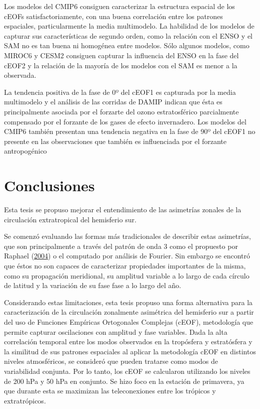 \documentclass[12pt,oneside,a4paper]{reedthesis}
\begin{document}
Los modelos del CMIP6 consiguen caracterizar la estructura espacial de los cEOFs satisfactoriamente, con una buena correlación entre los patrones espaciales, particularmente la media multimodelo.
La habilidad de los modelos de capturar sus características de segundo orden, como la relación con el ENSO y el SAM no es tan buena ni homogénea entre modelos.
Sólo algunos modelos, como MIROC6 y CESM2 consiguen capturar la influencia del ENSO en la fase del cEOF2 y la relación de la mayoría de los modelos con el SAM es menor a la observada.

La tendencia positiva de la fase de 0º del cEOF1 es capturada por la media multimodelo y el análisis de las corridas de DAMIP indican que ésta es principalmente asociada por el forzarte del ozono estratosférico parcialmente compensado por el forzante de los gases de efecto invernadero.
Los modelos del CMIP6 también presentan una tendencia negativa en la fase de 90º del cEOF1 no presente en las observaciones que también es influenciada por el forzante antropogénico

\hypertarget{conclusiones}{%
\chapter{Conclusiones}\label{conclusiones}}

Esta tesis se propuso mejorar el entendimiento de las asimetrías zonales de la circulación extratropical del hemisferio sur.

Se comenzó evaluando las formas más tradicionales de describir estas asimetrías, que son principalmente a través del patrón de onda 3 como el propuesto por Raphael (\protect\hyperlink{ref-raphael2004}{2004}) o el computado por análisis de Fourier.
Sin embargo se encontró que éstos no son capaces de caracterizar propiedades importantes de la misma, como su propagación meridional, su amplitud variable a lo largo de cada círculo de latitud y la variación de su fase fase a lo largo del año.

Considerando estas limitaciones, esta tesis propuso una forma alternativa para la caracterización de la circulación zonalmente asimétrica del hemisferio sur a partir del uso de Funciones Empíricas Ortogonales Complejas (cEOF), metodología que permite capturar oscilaciones con amplitud y fase variables.
Dada la alta correlación temporal entre los modos observados en la tropósfera y estratósfera y la similitud de sus patrones espaciales al aplicar la metodología cEOF en distintos niveles atmosféricos, se consideró que pueden tratarse como modos de variabilidad conjunta.
Por lo tanto, los cEOF se calcularon utilizando los niveles de 200 hPa y 50 hPa en conjunto.
Se hizo foco en la estación de primavera, ya que durante esta se maximizan las teleconexiones entre los trópicos y extratrópicos.
\end{document}
